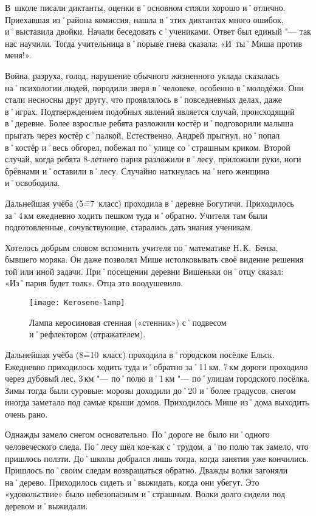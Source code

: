 В~школе писали диктанты, оценки в˚основном стояли хорошо и˚отлично. Приехавшая из˚района комиссия, нашла в˚этих диктантах много ошибок, и˚выставила двойки. Начали беседовать с˚учениками. Ответ был единый "--- так нас научили. Тогда учительница в˚порыве гнева сказала: «И~ты˚Миша против меня!».

Война, разруха, голод, нарушение обычного жизненного уклада сказалась на˚психологии людей, породили зверя в˚человеке, особенно в˚молодёжи. Они стали несносны друг другу, что проявлялось в˚повседневных делах, даже в˚играх. Подтверждением подобных явлений является случай, происходящий в˚деревне. Более взрослые ребята разложили костёр и˚подговорили малыша прыгать через костёр с˚палкой. Естественно, Андрей прыгнул, но˚попал в˚костёр и˚весь обгорел, побежал по˚улице со˚страшным криком. Второй случай, когда ребята 8-летнего парня разложили в˚лесу, приложили руки, ноги брёвнами и˚оставили в˚лесу. Случайно наткнулась на˚него женщина и˚освободила.

Дальнейшая учёба (5\==7~класс) проходила в˚деревне Богутичи. Приходилось за˚4\,км ежедневно ходить пешком туда и˚обратно. Учителя там были подготовленные, сочувствующие, старались дать знания ученикам. 

Хотелось добрым словом вспомнить учителя по˚математике Н.\,К.~Бенза, бывшего моряка. Он даже позволял Мише истолковывать своё видение решения той или иной задачи. При˚посещении деревни Вишеньки он˚отцу сказал: «Из˚парня будет толк». Отца это воодушевило.

\begin{wrapfigure}{O}{.25\textwidth}
\centering
\texttt{[image: Kerosene-lamp]}
\caption[{Лампа керосиновая стенная («стенник») с˚подвесом и˚рефлектором (отражателем).}]{Лампа керосиновая стенная («стенник») с˚подвесом и˚рефлектором (отражателем)\footnotemark.}
\label{fig:Kerosene-lamp}
\end{wrapfigure}

Дальнейшая учёба (8\==10~класс) проходила в˚городском посёлке Ельск. Ежедневно приходилось ходить туда и˚обратно за˚11\,км. 7\,км дороги проходило через дубовый лес, 3\,км "--- по˚полю и˚1\,км "--- по˚улицам городского посёлка. Зимы тогда были суровые: морозы доходили до˚20 и˚более градусов, снегом иногда заметало под самые крыши домов. Приходилось Мише из˚дома выходить очень рано. 

Однажды замело снегом основательно. По˚дороге не~было ни˚одного человеческого следа. По˚лесу шёл кое-как с˚трудом, а˚по полю так замело, что пришлось ползти. До˚школы добрался лишь тогда, когда занятия уже кончились. Пришлось по˚своим следам возвращаться обратно. Дважды волки загоняли на˚дерево. Приходилось сидеть и˚выжидать, когда они убегут. Это «удовольствие» было небезопасным и˚страшным. Волки долго сидели под деревом и˚выжидали.

